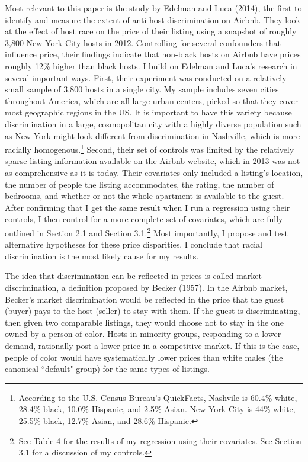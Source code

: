 Most relevant to this paper is the study by Edelman and Luca (2014), the first to identify and measure the extent of anti-host discrimination on Airbnb.\cite{edelman} They look at the effect of host race on the price of their listing using a snapshot of roughly 3,800 New York City hosts in 2012. Controlling for several confounders that influence price, their findings indicate that non-black hosts on Airbnb have prices roughly 12\% higher than black hosts. I build on Edelman and Luca's research in several important ways. First, their experiment was conducted on a relatively small sample of 3,800 hosts in a single city. My sample includes seven cities throughout America, which are all large urban centers, picked so that they cover most geographic regions in the US. It is important to have this variety because discrimination in a large, cosmopolitan city with a highly diverse population such as New York might look different from discrimination in Nashville, which is more racially homogenous.\footnote{According to the U.S. Census Bureau's QuickFacts, Nashvile is 60.4\% white, 28.4\% black, 10.0\% Hispanic, and 2.5\% Asian. New York City is 44\% white, 25.5\% black, 12.7\% Asian, and 28.6\% Hispanic.} Second, their set of controls was limited by the relatively sparse listing information available on the Airbnb website, which in 2013 was not as comprehensive as it is today. Their covariates only included a listing's location, the number of people the listing accommodates, the rating, the number of bedrooms, and whether or not the whole apartment is available to the guest. After confirming that I get the same result when I run a regression using their controls, I then control for a more complete set of covariates, which are fully outlined in Section 2.1 and Section 3.1.\footnote{See Table 4 for the results of my regression using their covariates. See Section 3.1 for a discussion of my controls.} Most importantly, I propose and test alternative hypotheses for these price disparities. I conclude that racial discrimination is the most likely cause for my results. 




The idea that discrimination can be reflected in prices is called market discrimination, a definition proposed by Becker (1957).\cite{becker} In the Airbnb market, Becker's market discrimination would be reflected in the price that the guest (buyer) pays to the host (seller) to stay with them. If the guest is discriminating, then given two comparable listings, they would choose not to stay in the one owned by a person of color. Hosts in minority groups, responding to a lower demand, rationally post a lower price in a competitive market. If this is the case, people of color would have systematically lower prices than white males (the canonical ``default" group) for the same types of listings. 

